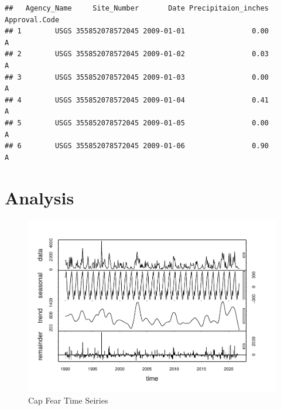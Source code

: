 \documentclass[
  12pt,
]{article}
\newenvironment{Shaded}{\begin{snugshade}}{\end{snugshade}}
\newcommand{\AttributeTok}[1]{\textcolor[rgb]{0.77,0.63,0.00}{#1}}
\newcommand{\DecValTok}[1]{\textcolor[rgb]{0.00,0.00,0.81}{#1}}
\newcommand{\FunctionTok}[1]{\textcolor[rgb]{0.00,0.00,0.00}{#1}}
\newcommand{\NormalTok}[1]{#1}
\newcommand{\OtherTok}[1]{\textcolor[rgb]{0.56,0.35,0.01}{#1}}
\newcommand{\SpecialCharTok}[1]{\textcolor[rgb]{0.00,0.00,0.00}{#1}}
\newcommand{\StringTok}[1]{\textcolor[rgb]{0.31,0.60,0.02}{#1}}
\begin{document}
\begin{verbatim}
##   Agency_Name     Site_Number       Date Precipitaion_inches Approval.Code
## 1        USGS 355852078572045 2009-01-01                0.00             A
## 2        USGS 355852078572045 2009-01-02                0.03             A
## 3        USGS 355852078572045 2009-01-03                0.00             A
## 4        USGS 355852078572045 2009-01-04                0.41             A
## 5        USGS 355852078572045 2009-01-05                0.00             A
## 6        USGS 355852078572045 2009-01-06                0.90             A
\end{verbatim}

\newpage

\hypertarget{analysis}{%
\section{Analysis}\label{analysis}}

\begin{Shaded}
\end{Shaded}

\begin{figure}
\centering
\includegraphics{Project_files/figure-latex/Cap Fear Time serries-1.pdf}
\caption{Cap Fear Time Seiries}
\end{figure}
\end{document}
